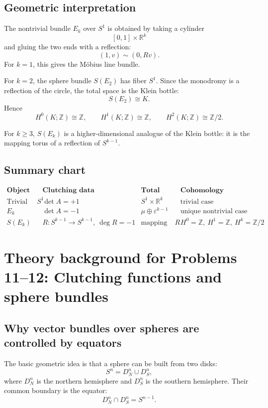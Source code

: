 \documentclass[12pt,a4paper]{article}
\theoremstyle{notespace}
\begin{document}
\subsection{Geometric interpretation}

The nontrivial bundle \(E_k\) over \(S^1\) is obtained by taking a cylinder
\[
[0,1]\times \mathbb{R}^k
\]
and gluing the two ends with a reflection:
\[
(1,v)\sim (0,Rv).
\]
For \(k=1\), this gives the Möbius line bundle.

For \(k=2\), the sphere bundle \(S(E_2)\) has fiber \(S^1\). Since the monodromy is a reflection of the circle, the total space is the Klein bottle:
\[
S(E_2)\cong K.
\]
Hence
\[
H^0(K;\mathbb{Z})\cong \mathbb{Z},
\qquad
H^1(K;\mathbb{Z})\cong \mathbb{Z},
\qquad
H^2(K;\mathbb{Z})\cong \mathbb{Z}/2.
\]

For \(k\geq 3\), \(S(E_k)\) is a higher-dimensional analogue of the Klein bottle: it is the mapping torus of a reflection of \(S^{k-1}\).

\subsection{Summary chart}

\[
\begin{array}{c|c|c|c}
	\textbf{Object} & \textbf{Clutching data} & \textbf{Total space} & \textbf{Cohomology} \\
	\hline
	\text{Trivial bundle over }S^1
	&
	\det A=+1
	&
	S^1\times \mathbb{R}^k
	&
	\text{trivial case}
	\\[2mm]
	E_k
	&
	\det A=-1
	&
	\mu\oplus \varepsilon^{k-1}
	&
	\text{unique nontrivial case}
	\\[2mm]
	S(E_k)
	&
	R:S^{k-1}\to S^{k-1},\ \deg R=-1
	&
	\text{mapping torus of }R
	&
	H^0=\mathbb{Z},\ H^1=\mathbb{Z},\ H^k=\mathbb{Z}/2
\end{array}
\]

\section{Theory background for Problems 11--12:
	Clutching functions and sphere bundles}

\subsection{Why vector bundles over spheres are controlled by equators}

The basic geometric idea is that a sphere can be built from two disks:
\[
S^n=D_N^n\cup D_S^n,
\]
where \(D_N^n\) is the northern hemisphere and \(D_S^n\) is the southern hemisphere. Their common boundary is the equator:
\[
D_N^n\cap D_S^n=S^{n-1}.
\]
\end{document}
